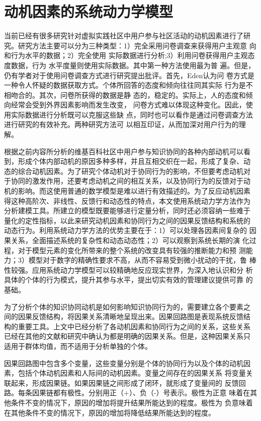 \section{动机因素的系统动力学模型}
\label{sec:sd-model}
当前已经有很多研究针对虚拟实践社区中用户参与社区活动的动机因素进行了研
究。研究方法主要可以分为三种类型：1）完全采用问卷调查来获得用户主观意
向和行为水平的数据\cite{yang2010motivations,yu2010exploring}；2）完全使用
实际数据进行分析\cite{Zhang2006};3）利用问卷获得用户主观态度数据，行为
水平度量则使用实际数据\cite{nov2010analysis}。其中第一种方法使用最为普
遍。但是，仍有学者对于使用问卷调查方式进行研究提出批评。首先，Eden认为问
卷方式是一种令人怀疑的数据获取方式。个体所回答的态度和倾向往往同其实际
行为是不相吻合的\cite{eden1995evaluating}。其次，问卷所获得的数据是静
态的，稳定的。实际上，人的态度和倾向经常会受到外界因素影响而发生改变，
问卷方式难以体现这种变化。因此，使用实际数据进行分析既可以克服这些缺
点，同时也可以看作是通过问卷调查方法进行研究的有效补充。两种研究方法可
以相互印证，从而加深对用户行为的理解。

根据之前内容所分析的维基百科社区中用户参与知识协同的各种内部动机可以看
到，形成个体内部动机的原因多种多样，并且互相交织在一起，形成了复杂、动
态的综合动机因素。为了研究个体动机对于协同行为的影响，不但要考虑动机对
于协同的激发作用，还要考虑动机之间的相互关系，以及协同行为的反馈对于动
机的影响。而这使用普通的数学模型是难以进行有效描述的。为了反应动机因素
得这种高阶次、非线性、反馈行和动态性的特点，本文使用系统动力学方法作为
分析建模工具。所建立的模型既要能够进行定量分析，同时还必须容纳一些难于
量化的定性指标，以此来研究动机因素和协同行为之间的因果反馈结构和系统的
动态行为。利用系统动力学方法的优势主要在于：1）可以处理各因素间复杂的
因果关系，全面描述系统的复杂性和动态动态性；2）可以观察到系统长期的演
化过程，对于模型元素的变化所带来的整个系统的改变具有较强的推断能力和预
测能力；3）模型对于数字的精确性要求不高，从而不容易受到微小扰动的干扰，鲁
棒性较强。应用系统动力学模型可以较精确地反应现实世界，为深入地认识和分
析具体的个体的行为模式，提升其参与水平，提出切实有效的管理建议提供可靠
的基础。


为了分析个体的知识协同动机是如何影响知识协同行为的，需要建立各个要素之
间的因果反馈结构，将因果关系清晰地呈现出来。因果回路图是表现系统反馈结
构的重要工具。上文中已经分析了各动机因素和协同行为之间的关系，这些关系
已经在其他的文献和研究中确认为都是明确的因果关系。但是，这种因果关系只
适用于群体均值，而不适用于分析单独的个体。

因果回路图中包含多个变量，这些变量分别是个体的协同行为以及个体的动机因
素，包括个体动机因素和人际间的动机因素。变量之间存在的因果关系
将变量关联起来，形成因果链。如果因果链之间形成了闭环，就形成了变量间的
反馈回路。每条因果链都有极性。分别用正（+）、负（-）号表示。极性为正意
味着在其他条件不变的情况下，原因的增加将提升结果所能达到的程度。极性为
负意味着在其他条件不变的情况下，原因的增加将降低结果所能达到的程度。

